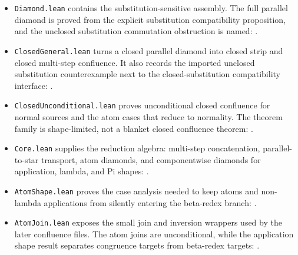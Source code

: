 \begin{itemize}
\item \texttt{Diamond.lean} contains the substitution-sensitive assembly. The
  full parallel diamond is proved from the explicit substitution compatibility
  proposition, and the unclosed substitution commutation obstruction is named:
  .
\item \texttt{ClosedGeneral.lean} turns a closed parallel diamond into closed
  strip and closed multi-step confluence. It also records the imported
  unclosed substitution counterexample next to the closed-substitution
  compatibility interface:
  .
\item \texttt{ClosedUnconditional.lean} proves unconditional closed confluence
  for normal sources and the atom cases that reduce to normality. The theorem
  family is shape-limited, not a blanket closed confluence theorem:
  .
\item \texttt{Core.lean} supplies the reduction algebra: multi-step
  concatenation, parallel-to-star transport, atom diamonds, and componentwise
  diamonds for application, lambda, and Pi shapes:
  .
\item \texttt{AtomShape.lean} proves the case analysis needed to keep atoms
  and non-lambda applications from silently entering the beta-redex branch:
  .
\item \texttt{AtomJoin.lean} exposes the small join and inversion wrappers used
  by the later confluence files. The atom joins are unconditional, while the
  application shape result separates congruence targets from beta-redex targets:
  .
\end{itemize}

